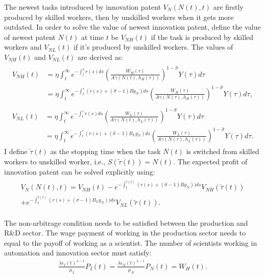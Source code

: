\documentclass[12pt]{article}
\begin{document}
The newest tasks introduced by innovation patent $V_N(N(t),t)$ are firstly produced by skilled workers, then by unskilled workers when it gets more outdated. In order to solve the value of newest innovation patent, define the value of newest patent $N(t)$ at time $t$ be $V_{NH}(t)$ if the task is produced by skilled workers and $V_{NL}(t)$ if it's produced by unskilled workers. The values of $V_{NH}(t)$ and $V_{NL}(t)$ are derived as: 
\begin{align*}
\begin{split}
V_{NH}(t) &= \eta\int_t^{\infty} e^{-\int_{t}^{\tau}r(s)ds}(\frac{W_H(\tau)}{A\gamma(N(t),h_H(\tau))})^{1-\hat{\sigma}}Y(\tau)d\tau \\
								&= \eta\int_t^{\infty} e^{-\int_{t}^{\tau}(r(s)+(\hat{\sigma}-1)Bg_N)ds}(\frac{W_H(\tau)}{A\gamma(N(\tau),h_H(\tau))})^{1-\hat{\sigma}}Y(\tau)d\tau,
\end{split} \\
\begin{split}
V_{NL}(t) &=\eta \int_t^{\infty} e^{-\int_{t}^{\tau}r(s)ds}(\frac{W_L(\tau)}{A\gamma(N(t),h_L(\tau))})^{1-\hat{\sigma}}Y(\tau)d\tau \\
								&= \eta \int_t^{\infty} e^{-\int_{t}^{\tau}(r(s)+(\hat{\sigma}-1)B_Lg_N)ds}(\frac{W_L(\tau)}{A\gamma(N(\tau),h_L(\tau))})^{1-\hat{\sigma}}Y(\tau)d\tau.
\end{split}
\end{align*}
I define $\tilde{\tau}(t)$ as the stopping time when the task $N(t)$ is switched from skilled workers to unskilled worker, i.e., $S(\tilde{\tau}(t)) = N(t)$. The expected profit of innovation patent can be solved explicitly using: 
\begin{align*}
\begin{split}
 V_N(N(t),t) = V_{NH}(t)-e^{-\int_{t}^{\tilde{\tau}(t)}(r(s)+(\hat{\sigma}-1)Bg_N))ds}V_{NH}(\tilde{\tau}(t)) \\
 +e^{-\int_{t}^{\tilde{\tau}(t)}(r(s)+(\hat{\sigma}-1)B_Lg_N))ds}V_{NL}(\tilde{\tau}(t)).
 \end{split}
\end{align*}

The non-arbitrage condition needs to be satisfied between the production and R\&D sector. The wage payment of working in the production sector needs to equal to the payoff of working as a scientist. The number of scientists working in automation and innovation sector must satisfy:
\begin{align}
\label{epsilon_NI}
\frac{\lambda\epsilon_I(t)^{\lambda-1}}{\mu_I}P_I(t) = \frac{\lambda\epsilon_N(t)^{\lambda-1}}{\mu_N}P_N(t) = W_H(t).
\end{align}
\end{document}
